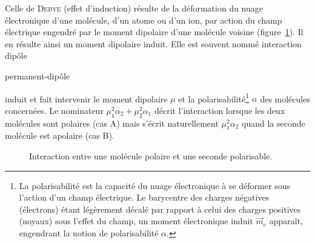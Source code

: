 Celle de \textsc{Debye} (effet d'induction) résulte de la déformation du nuage électronique d'une molécule, d'un atome ou d'un ion, par action du champ électrique engendré par le moment dipolaire d'une molécule voisine (figure~\ref{figDebye}). Il en résulte ainsi un moment dipolaire induit. Elle est souvent nommé interaction dipôle {permanent-dipôle{ induit et fait intervenir le moment dipolaire $\mu$ et la polarisabilité\footnote{La polarisabilité est la capacité du nuage électronique à se déformer sous l'action d'un champ électrique. Le barycentre des charges négatives (électrons) étant légèrement décalé par rapport à celui des charges positives (noyaux) sous l'effet du champ, un moment électronique induit $\vec{m}_{e}$ apparaît, engendrant la notion de polarisabilité $\alpha$.} $\alpha$ des molécules concernées. Le nominateur $\mu_{1}^{2}\alpha_{2}+\mu_{2}^{2}\alpha_{1}$ décrit l'interaction lorsque les deux molécules sont polaires (cas A) mais s'écrit naturellement $\mu_{1}^{2}\alpha_{2}$ quand la seconde molécule est apolaire (cas B).

\begin{figure}[h]
\centering
{}
\caption{Interaction entre une molécule polaire et une seconde polarisable.}
\label{figDebye}
\end{figure}

}}
